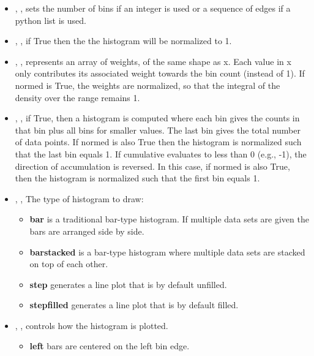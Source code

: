 \begin{itemize}
  \item {}, , sets
  the number of bins if an integer is used or a sequence of edges if a
  python list is used.
  \item {}, , if True then the
  the histogram will be normalized to 1.
  \item {}, , represents an
  array of weights, of the same shape as x.
  Each value in x only contributes its associated weight towards the bin count
  (instead of 1).
  If normed is True, the weights are normalized, so that the integral of the
  density over the range remains 1.
  \item {}, , if True, then a
  histogram is computed where each bin gives the counts in that bin plus all
  bins for smaller values.
  The last bin gives the total number of data points.
  If normed is also True then the histogram is normalized such that the last bin
  equals 1.
  If cumulative evaluates to less than 0 (e.g., -1), the direction of
  accumulation is reversed.
  In this case, if normed is also True, then the histogram is normalized such
  that the first bin equals 1.
  \item {}, ,
  The type of histogram to draw:
  \begin{itemize}
    \item \textbf{bar} is a traditional bar-type histogram.
    If multiple data sets are given the bars are arranged side by side.
    \item \textbf{barstacked} is a bar-type histogram where multiple data sets
    are stacked on top of each other.
    \item \textbf{step} generates a line plot that is by default unfilled.
    \item \textbf{stepfilled} generates a line plot that is by default filled.
  \end{itemize}
  \item {}, , controls how the
  histogram is plotted.
  \begin{itemize}
    \item \textbf{left} bars are centered on the left bin edge.

\end{itemize}
\end{itemize}
